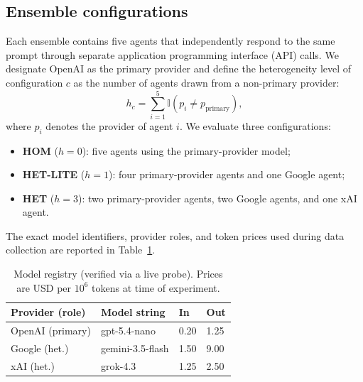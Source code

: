 \documentclass{ieeeaccess}
\begin{document}
\subsection{Ensemble configurations}
Each ensemble contains five agents that independently respond to the same prompt
through separate application programming interface (API) calls. We designate OpenAI as the primary provider and
define the heterogeneity level of configuration $c$ as the number of agents
drawn from a non-primary provider:
\begin{equation}
h_c=\sum_{i=1}^{5}\mathbb{I}\left(p_i\neq p_{\mathrm{primary}}\right),
\end{equation}
where $p_i$ denotes the provider of agent $i$. We evaluate three
configurations:
\begin{itemize}
\item \textbf{HOM} ($h{=}0$): five agents using the primary-provider model;
\item \textbf{HET-LITE} ($h{=}1$): four primary-provider agents and one Google
agent;
\item \textbf{HET} ($h{=}3$): two primary-provider agents, two Google agents,
and one xAI agent.
\end{itemize}
The exact model identifiers, provider roles, and token prices used during data
collection are reported in Table~\ref{tab:models}.

\begin{table}[!t]
\centering
\caption{Model registry (verified via a live probe). Prices are USD per $10^6$
tokens at time of experiment.}
\label{tab:models}
\begin{tabular}{llll}
\toprule
Provider (role) & Model string & In & Out \\
\midrule
OpenAI (primary) & gpt-5.4-nano & 0.20 & 1.25 \\
Google (het.) & gemini-3.5-flash & 1.50 & 9.00 \\
xAI (het.) & grok-4.3 & 1.25 & 2.50 \\
\bottomrule
\end{tabular}
\end{table}
\end{document}
